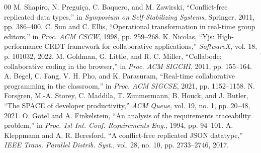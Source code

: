 \documentclass[conference]{IEEEtran}
\begin{document}
\begin{thebibliography}{00}
 M. Shapiro, N. Preguiça, C. Baquero, and M. Zawirski, ``Conflict-free replicated data types,'' in \textit{Symposium on Self-Stabilizing Systems}, Springer, 2011, pp. 386--400.
 C. Sun and C. Ellis, ``Operational transformation in real-time group editors,'' in \textit{Proc. ACM CSCW}, 1998, pp. 259--268.
 K. Nicolas, ``Yjs: High-performance CRDT framework for collaborative applications,'' \textit{SoftwareX}, vol. 18, p. 101032, 2022.
 M. Goldman, G. Little, and R. C. Miller, ``Collabode: collaborative coding in the browser,'' in \textit{Proc. ACM SIGCHI}, 2011, pp. 155--164.
 A. Begel, C. Fang, V. H. Pho, and K. Parasuram, ``Real-time collaborative programming in the classroom,'' in \textit{Proc. ACM SIGCSE}, 2021, pp. 1152--1158.
 N. Forsgren, M.-A. Storey, C. Maddila, T. Zimmermann, B. Houck, and J. Butler, ``The SPACE of developer productivity,'' \textit{ACM Queue}, vol. 19, no. 1, pp. 20--48, 2021.
 O. Gotel and A. Finkelstein, ``An analysis of the requirements traceability problem,'' in \textit{Proc. 1st Int. Conf. Requirements Eng.}, 1994, pp. 94--101.
 A. Kleppmann and A. R. Beresford, ``A conflict-free replicated JSON datatype,'' \textit{IEEE Trans. Parallel Distrib. Syst.}, vol. 28, no. 10, pp. 2733--2746, 2017.
\end{thebibliography}
\end{document}
